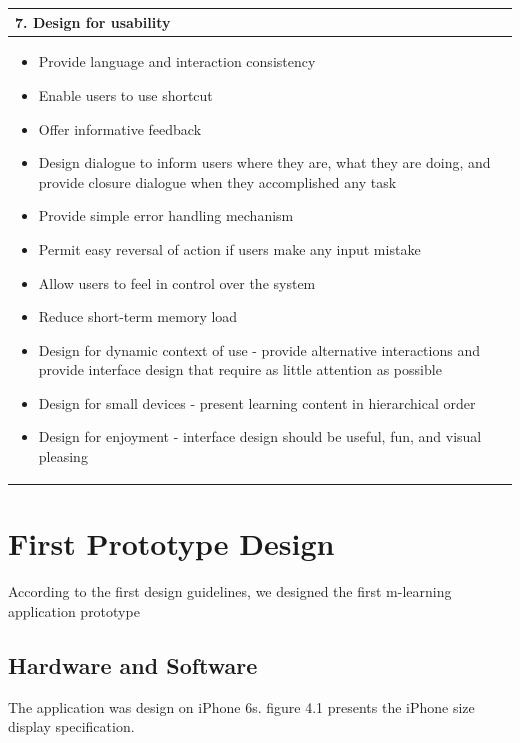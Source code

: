 \newpage 
\begin{table}[!htb]
\centering
\begin{tabular}{ |p{13 cm}|} 
\hline
\textbf{7. Design for usability}\\
\hline 
\begin{itemize} 
\item Provide language and interaction consistency 
\item Enable users to use shortcut 
\item Offer informative feedback
\item Design dialogue to inform users where they are, what they are doing, and provide closure dialogue when they accomplished any task 
\item Provide simple error handling mechanism 
\item Permit easy reversal of action if users make any input mistake 
\item Allow users to feel in control over the system
\item Reduce short-term memory load 
\item Design for dynamic context of use - provide alternative interactions and provide interface design that require as little attention as possible
\item Design for small devices - present learning content in hierarchical order 
\item Design for enjoyment - interface design should be useful, fun, and visual pleasing 
\end{itemize} \\
\hline
\end{tabular}
\end{table}


\newpage

\section{First Prototype Design}  

According to the first design guidelines, we designed the first m-learning application prototype

\subsection{Hardware and Software}
The application was design on iPhone 6s. figure 4.1 presents the iPhone size display specification. 

